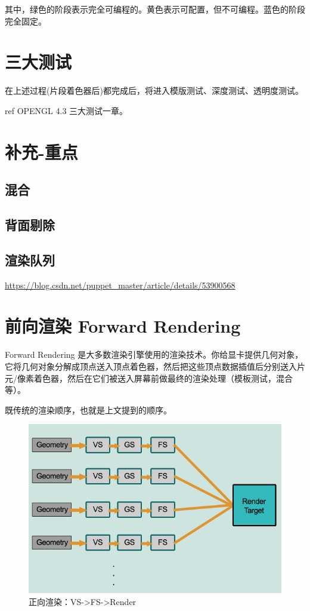 \documentclass[UTF8,a4paper,12pt]{ctexbook}
\begin{document}
		其中，\color{olive}绿色的阶段表示完全可编程的。\color{yellow}黄色表示可配置，但不可编程。\color{blue}蓝色的阶段完全固定。\color{black}
		
	\section{三大测试}
	
		在上述过程(片段着色器后)都完成后，将进入模版测试、深度测试、透明度测试。
	
		ref OPENGL 4.3 三大测试一章。


	\section{补充-重点}
		\subsection{混合}
		
		
		\subsection{背面剔除}
		
		
		\subsection{渲染队列}
			\url{https://blog.csdn.net/puppet_master/article/details/53900568}
		
	
	\section{前向渲染 Forward Rendering}
		Forward Rendering 是大多数渲染引擎使用的渲染技术。你给显卡提供几何对象，它将几何对象分解成顶点送入顶点着色器，然后把这些顶点数据插值后分别送入片元/像素着色器，然后在它们被送入屏幕前做最终的渲染处理（模板测试，混合等）。
	
		既传统的渲染顺序，也就是上文提到的顺序。
		
		\begin{figure}[H]
			\centering
			\includegraphics[width=.9\linewidth]{Forward}
			\caption{正向渲染：VS->FS->Render}
		\end{figure}
		
\end{document}
